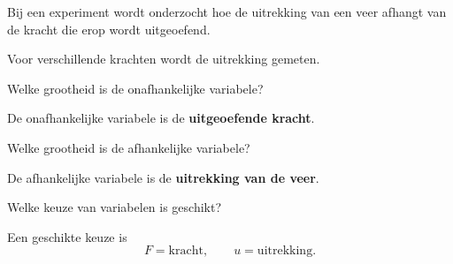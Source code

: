 \documentclass{ximera}
\begin{document}
\begin{oefening}{\oefB \ESS}

Bij een experiment wordt onderzocht hoe de uitrekking van een veer
afhangt van de kracht die erop wordt uitgeoefend.

Voor verschillende krachten wordt de uitrekking gemeten.

\begin{question}
Welke grootheid is de onafhankelijke variabele?

\begin{multipleChoice}
\end{multipleChoice}


\begin{oplossing}
De onafhankelijke variabele is de \textbf{uitgeoefende kracht}.
\end{oplossing}

\end{question}

\begin{question}
Welke grootheid is de afhankelijke variabele?

\begin{multipleChoice}
\end{multipleChoice}


\begin{oplossing}
De afhankelijke variabele is de \textbf{uitrekking van de veer}.
\end{oplossing}

\end{question}

\begin{question}
Welke keuze van variabelen is geschikt?

\begin{multipleChoice}
\end{multipleChoice}


\begin{oplossing}
Een geschikte keuze is
\[
F=\text{kracht},
\qquad
u=\text{uitrekking}.
\]
\end{oplossing}

\end{question}

\end{oefening}
\end{document}
